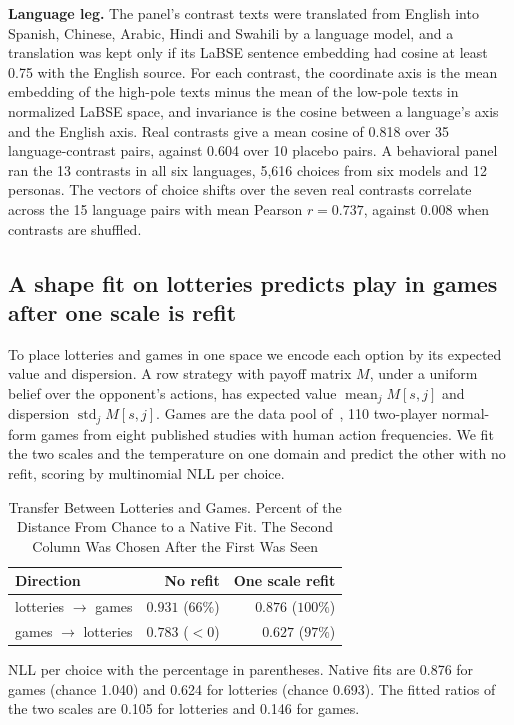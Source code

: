 \documentclass[journal]{IEEEtran}
\begin{document}
\textbf{Language leg.}
The panel's contrast texts were translated from English into Spanish, Chinese, Arabic, Hindi and Swahili by a language model, and a translation was kept only if its LaBSE sentence embedding had cosine at least 0.75 with the English source.
For each contrast, the coordinate axis is the mean embedding of the high-pole texts minus the mean of the low-pole texts in normalized LaBSE space, and invariance is the cosine between a language's axis and the English axis.
Real contrasts give a mean cosine of 0.818 over 35 language-contrast pairs, against 0.604 over 10 placebo pairs.
A behavioral panel ran the 13 contrasts in all six languages, 5{,}616 choices from six models and 12 personas.
The vectors of choice shifts over the seven real contrasts correlate across the 15 language pairs with mean Pearson $r=0.737$, against 0.008 when contrasts are shuffled.

\subsection{A shape fit on lotteries predicts play in games after one scale is refit}
To place lotteries and games in one space we encode each option by its expected value and dispersion.
A row strategy with payoff matrix $M$, under a uniform belief over the opponent's actions, has expected value $\operatorname{mean}_j M[s,j]$ and dispersion $\operatorname{std}_j M[s,j]$.
Games are the data pool of~\cite{wright2017}, 110 two-player normal-form games from eight published studies with human action frequencies.
We fit the two scales and the temperature on one domain and predict the other with no refit, scoring by multinomial NLL per choice.

\begin{table}[!t]
\renewcommand{\arraystretch}{1.15}
\caption{Transfer Between Lotteries and Games. Percent of the Distance From Chance to a Native Fit. The Second Column Was Chosen After the First Was Seen}
\label{tab:polar}
\centering
\begin{tabular}{l r r}
\toprule
\textbf{Direction} & \textbf{No refit} & \textbf{One scale refit} \\
\midrule
lotteries $\to$ games & $0.931$ \; ($66\%$) & $0.876$ \; ($100\%$) \\
games $\to$ lotteries & $0.783$ \; ($<0$)   & $0.627$ \; ($97\%$) \\
\bottomrule
\end{tabular}
\begin{flushleft}
\footnotesize{NLL per choice with the percentage in parentheses. Native fits are 0.876 for games (chance 1.040) and 0.624 for lotteries (chance 0.693). The fitted ratios of the two scales are 0.105 for lotteries and 0.146 for games.}
\end{flushleft}
\end{table}
\end{document}

